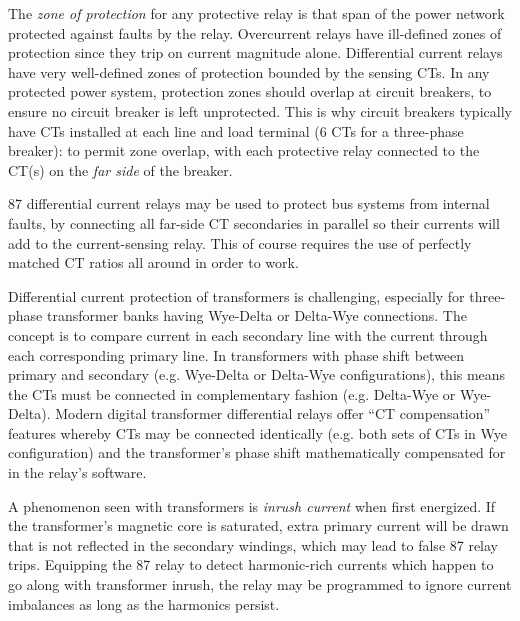 \vskip 10pt

The {\it zone of protection} for any protective relay is that span of the power network protected against faults by the relay.  Overcurrent relays have ill-defined zones of protection since they trip on current magnitude alone.  Differential current relays have very well-defined zones of protection bounded by the sensing CTs.  In any protected power system, protection zones should overlap at circuit breakers, to ensure no circuit breaker is left unprotected.  This is why circuit breakers typically have CTs installed at each line and load terminal (6 CTs for a three-phase breaker): to permit zone overlap, with each protective relay connected to the CT(s) on the {\it far side} of the breaker.

\vskip 10pt

87 differential current relays may be used to protect bus systems from internal faults, by connecting all far-side CT secondaries in parallel so their currents will add to the current-sensing relay.  This of course requires the use of perfectly matched CT ratios all around in order to work.

\vskip 10pt

Differential current protection of transformers is challenging, especially for three-phase transformer banks having Wye-Delta or Delta-Wye connections.  The concept is to compare current in each secondary line with the current through each corresponding primary line.  In transformers with phase shift between primary and secondary (e.g. Wye-Delta or Delta-Wye configurations), this means the CTs must be connected in complementary fashion (e.g. Delta-Wye or Wye-Delta).  Modern digital transformer differential relays offer ``CT compensation'' features whereby CTs may be connected identically (e.g. both sets of CTs in Wye configuration) and the transformer's phase shift mathematically compensated for in the relay's software. 

\vskip 10pt

A phenomenon seen with transformers is {\it inrush current} when first energized.  If the transformer's magnetic core is saturated, extra primary current will be drawn that is not reflected in the secondary windings, which may lead to false 87 relay trips.  Equipping the 87 relay to detect harmonic-rich currents which happen to go along with transformer inrush, the relay may be programmed to ignore current imbalances as long as the harmonics persist.





